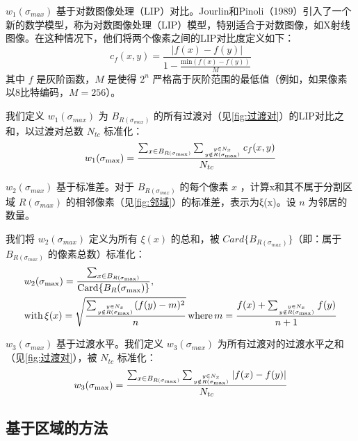 $w_1(\sigma_{max})$ 基于对数图像处理（LIP）对比。Jourlin和Pinoli（1989）\cite{jourlin1989contrast}引入了一个新的数学模型，称为对数图像处理（LIP）模型，特别适合于对数图像，如X射线图像。在这种情况下，他们将两个像素之间的LIP对比度定义如下：
\begin{equation}
    c_f(x,y)=\frac{|f(x)-f(y)|}{1-\frac{\text{min}(f(x)-f(y))}{M}}
\end{equation}
其中 $f$ 是灰阶函数，$M$ 是使得 $2^n$ 严格高于灰阶范围的最低值（例如，如果像素以8比特编码，$M=256$）。

我们定义 $w_1(\sigma_{max})$ 为 $B_{R(\sigma_{max})}$ 的所有过渡对（见\cref{fig:过渡对}）的LIP对比之和，以过渡对总数 $N_{tc}$ 标准化：
\begin{equation}
    w_1(\sigma_{\text{max}})=\frac{\sum_{x \in B_{R(\sigma_{\text{max}})}} \sum_{y \in N_x \atop y \notin R(\sigma_{\text{max}})} c_f(x,y) } {N_{tc}}
\end{equation}

$w_2(\sigma_{max})$ 基于标准差。对于 $B_{R(\sigma_{max})}$ 的每个像素 $x$ ，计算x和其不属于分割区域 $R(\sigma_{max})$ 的相邻像素（见\cref{fig:邻域}）的标准差，表示为ξ(x)。设 $n$ 为邻居的数量。

我们将 $w_2(\sigma_{max})$ 定义为所有 $\xi (x)$ 的总和，被 $Card\{B_{R(\sigma_{max})}\}$（即：属于 $B_{R(\sigma_{max})}$ 的像素总数）标准化：
\begin{equation}
    \begin{aligned}
    & w_2(\sigma_{\text{max}})=\frac{\sum_{x \in B_{R(\sigma_{\text{max}})}}}{\text{Card}\{B_R(\sigma_{\text{max}})\}}, \\
    & \text{with} \, \xi(x)=\sqrt{\frac{\sum_{y \in N_x \atop y \notin R(\sigma_{\text{max}})}(f(y)-m)^2}{n}} \, \text{where} \, m=\frac{f(x)+\sum_{y \in N_x \atop y \notin R(\sigma_{\text{max}})}f(y)}{n+1} 
    \end{aligned}
\end{equation}

$w_3(\sigma_{max})$ 基于过渡水平。我们定义 $w_3(\sigma_{max})$ 为所有过渡对的过渡水平之和（见\cref{fig:过渡对}），被 $N_{tc}$ 标准化：
\begin{equation}
    w_3(\sigma_{\text{max}})=\frac{\sum_{x \in B_{R(\sigma_{\text{max}})}} \sum_{y \in N_x \atop y \notin R(\sigma_{\text{max}})} |f(x)-f(y)| } {N_{tc}}
\end{equation}

\subsection{基于区域的方法}

